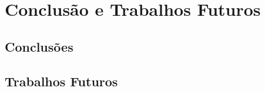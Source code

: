 \chapter{Conclusão e Trabalhos Futuros}
\label{cap:conclusao}







\section{Conclusões}



\section{Trabalhos Futuros}



